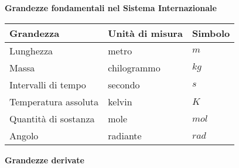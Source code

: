 \documentclass[10pt,a4paper]{book}
\begin{document}
\begin{center}
	\textbf{Grandezze fondamentali nel Sistema Internazionale}
\end{center}

\begin{table}[!h]
	\centering
	\begin{tabular}{l|l|l}
		\hline
		\textbf{Grandezza} & \textbf{Unità di misura} & \textbf{Simbolo} \\
		\hline
		Lunghezza & metro & $m$ \\
		Massa & chilogrammo & $kg$ \\
		Intervalli di tempo & secondo & $s$ \\
		Temperatura assoluta & kelvin & $K$ \\
		Quantità di sostanza & mole & $mol$ \\
		Angolo & radiante & $rad$ \\
	\end{tabular}
\end{table}

\begin{center}
	\textbf{Grandezze derivate}
\end{center}
\end{document}
